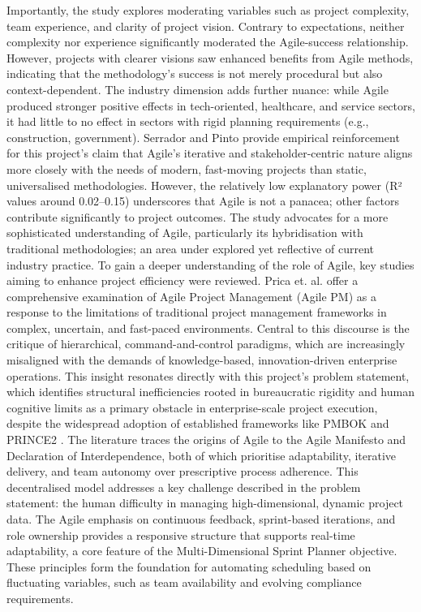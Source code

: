 \documentclass{report}
\begin{document}
Importantly, the study explores moderating variables such as project complexity, team experience, and clarity of project vision. Contrary to expectations, neither complexity nor experience significantly moderated the Agile-success relationship. However, projects with clearer visions saw enhanced benefits from Agile methods, indicating that the methodology’s success is not merely procedural but also context-dependent. The industry dimension adds further nuance: while Agile produced stronger positive effects in tech-oriented, healthcare, and service sectors, it had little to no effect in sectors with rigid planning requirements (e.g., construction, government). Serrador and Pinto provide empirical reinforcement for this project’s claim that Agile’s iterative and stakeholder-centric nature aligns more closely with the needs of modern, fast-moving projects than static, universalised methodologies.
However, the relatively low explanatory power (R² values around 0.02–0.15) underscores that Agile is not a panacea; other factors contribute significantly to project outcomes. The study advocates for a more sophisticated understanding of Agile, particularly its hybridisation with traditional methodologies; an area under explored yet reflective of current industry practice.
To gain a deeper understanding of the role of Agile,  key studies aiming to enhance project efficiency were reviewed. Prica et. al. offer a comprehensive examination of Agile Project Management (Agile PM) as a response to the limitations of traditional project management frameworks in complex, uncertain, and fast-paced environments. Central to this discourse is the critique of hierarchical, command-and-control paradigms, which are increasingly misaligned with the demands of knowledge-based, innovation-driven enterprise operations. This insight resonates directly with this project’s problem statement, which identifies structural inefficiencies rooted in bureaucratic rigidity and human cognitive limits as a primary obstacle in enterprise-scale project execution, despite the widespread adoption of established frameworks like PMBOK and PRINCE2 \parencite{pricaEnhancingProjectEfficiency2025}.
The literature traces the origins of Agile to the Agile Manifesto and Declaration of Interdependence, both of which prioritise adaptability, iterative delivery, and team autonomy over prescriptive process adherence. This decentralised model addresses a key challenge described in the problem statement: the human difficulty in managing high-dimensional, dynamic project data. The Agile emphasis on continuous feedback, sprint-based iterations, and role ownership provides a responsive structure that supports real-time adaptability, a core feature of the Multi-Dimensional Sprint Planner objective. These principles form the foundation for automating scheduling based on fluctuating variables, such as team availability and evolving compliance requirements.
\end{document}
